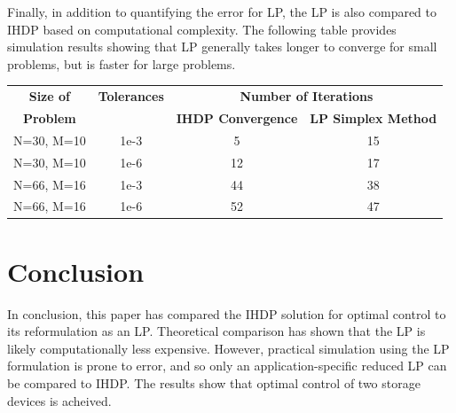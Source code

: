 \documentclass[conference]{IEEEtran}
\begin{document}
Finally, in addition to quantifying the error for LP, the LP is also compared to IHDP based on computational complexity. The following table provides simulation results showing that LP generally takes longer to converge for small problems, but is faster for large problems. %

\begin{table}[htbp]
	\begin{center}
		\begin{tabular}{|c|c|c|c|}
			\hline
			\textbf{Size of}&\textbf{Tolerances}&\multicolumn{2}{|c|}{\textbf{Number of Iterations}} \\
			\cline{3-4} 
			\textbf{Problem} & & \textbf{IHDP Convergence} &  \textbf{LP Simplex Method} \\
			\hline
			N=30, M=10& 1e-3 & 5 & 15 \\
			\hline
			N=30, M=10& 1e-6 & 12 & 17 \\
			\hline
			N=66, M=16& 1e-3 & 44 & 38 \\
			\hline
			N=66, M=16& 1e-6 & 52 & 47 \\
			\hline
		\end{tabular}
		\label{tab1}
	\end{center}
\end{table}

\section{Conclusion}
In conclusion, this paper has compared the IHDP solution for optimal control to its reformulation as an LP. Theoretical comparison has shown that the LP is likely computationally less expensive. However, practical simulation using the LP formulation is prone to error, and so only an application-specific reduced LP can be compared to IHDP. The results show that optimal control of two storage devices is acheived.

\printbibliography
\end{document}
